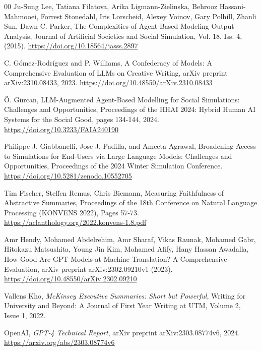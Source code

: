 \documentclass[preprint,12pt]{elsarticle}
\begin{document}
\begin{thebibliography}{00}
Ju-Sung Lee, Tatiana Filatova, Arika Ligmann-Zielinska, Behrooz Hassani-Mahmooei, Forrest Stonedahl, Iris Lorscheid, Alexey Voinov, Gary Polhill, Zhanli Sun, Dawn C. Parker,
The Complexities of Agent-Based Modeling Output Analysis,
Journal of Artificial Societies and Social Simulation, Vol. 18, Iss. 4, (2015).
\href{https://doi.org/10.18564/jasss.2897}{https://doi.org/10.18564/jasss.2897}


C. Gómez-Rodríguez and P. Williams,
A Confederacy of Models: A Comprehensive Evaluation of LLMs on Creative Writing,
arXiv preprint arXiv:2310.08433,
2023.
\href{https://doi.org/10.48550/arXiv.2310.08433}{https://doi.org/10.48550/arXiv.2310.08433}

Ö. Gürcan,
LLM-Augmented Agent-Based Modelling for Social Simulations: Challenges and Opportunities,
Proceedings of the HHAI 2024: Hybrid Human AI Systems for the Social Good, pages 134-144,
2024.
\href{https://doi.org/10.3233/FAIA240190}{https://doi.org/10.3233/FAIA240190}


Philippe J. Giabbanelli, Jose J. Padilla, and Ameeta Agrawal,
Broadening Access to Simulations for End-Users via Large Language Models: Challenges and Opportunities,
Proceedings of the 2024 Winter Simulation Conference.
\href{https://doi.org/10.5281/zenodo.10552705}{https://doi.org/10.5281/zenodo.10552705}


Tim Fischer, Steffen Remus, Chris Biemann,
Measuring Faithfulness of Abstractive Summaries,
Proceedings of the 18th Conference on Natural Language Processing (KONVENS 2022), Pages 57-73.
\href{https://aclanthology.org/2022.konvens-1.8.pdf}{https://aclanthology.org/2022.konvens-1.8.pdf}


Amr Hendy, Mohamed Abdelrehim, Amr Sharaf, Vikas Raunak, Mohamed Gabr, Hitokazu Matsushita, Young Jin Kim, Mohamed Afify, Hany Hassan Awadalla,
How Good Are GPT Models at Machine Translation? A Comprehensive Evaluation,
arXiv preprint arXiv:2302.09210v1 (2023).
\href{https://doi.org/10.48550/arXiv.2302.09210}{https://doi.org/10.48550/arXiv.2302.09210}

Vallens Kho,
\textit{McKinsey Executive Summaries: Short but Powerful},
Writing for University and Beyond: A Journal of First Year Writing at UTM, Volume 2, Issue 1, 2022.



OpenAI,
\textit{GPT-4 Technical Report},
arXiv preprint arXiv:2303.08774v6, 2024.
\href{https://arxiv.org/abs/2303.08774v6}{https://arxiv.org/abs/2303.08774v6}


\end{thebibliography}
\end{document}
